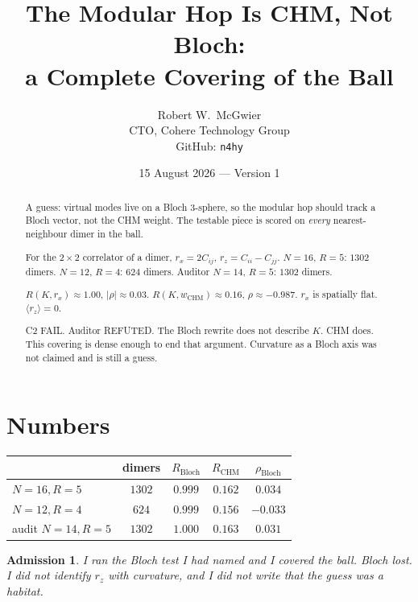 \documentclass[11pt]{article}
\title{\textbf{The Modular Hop Is CHM, Not Bloch:\\
a Complete Covering of the Ball}}
\author{Robert W.\ McGwier\\
\small CTO, Cohere Technology Group\\
\small GitHub: \texttt{n4hy}}
\date{15 August 2026 --- Version 1}
\newtheorem*{admission}{Admission}
\begin{document}
\maketitle

\begin{abstract}
\noindent
A guess: virtual modes live on a Bloch $3$-sphere, so the
modular hop should track a Bloch vector, not the CHM weight.
The testable piece is scored on \emph{every} nearest-neighbour
dimer in the ball.

For the $2\times 2$ correlator of a dimer,
$r_x=2C_{ij}$, $r_z=C_{ii}-C_{jj}$.
$N=16$, $R=5$: $1302$ dimers. $N=12$, $R=4$: $624$ dimers.
Auditor $N=14$, $R=5$: $1302$ dimers.

$R(K,r_x)\approx 1.00$, $\lvert\rho\rvert\approx 0.03$.
$R(K,w_{\mathrm{CHM}})\approx 0.16$, $\rho\approx -0.987$.
$r_x$ is spatially flat. $\langle r_z\rangle=0$.

C2 FAIL. Auditor REFUTED. The Bloch rewrite does not describe
$K$. CHM does. This covering is dense enough to end that
argument. Curvature as a Bloch axis was not claimed and is
still a guess.
\end{abstract}

\section{Numbers}

\begin{center}
\begin{tabular}{lcccc}
\hline
 & dimers & $R_{\mathrm{Bloch}}$ & $R_{\mathrm{CHM}}$ & $\rho_{\mathrm{Bloch}}$ \\
\hline
$N=16,R=5$ & $1302$ & $0.999$ & $0.162$ & $0.034$ \\
$N=12,R=4$ & $624$ & $0.999$ & $0.156$ & $-0.033$ \\
audit $N=14,R=5$ & $1302$ & $1.000$ & $0.163$ & $0.031$ \\
\hline
\end{tabular}
\end{center}

\begin{admission}
I ran the Bloch test I had named and I covered the ball. Bloch
lost. I did not identify $r_z$ with curvature, and I did not
write that the guess was a habitat.
\end{admission}
\end{document}
